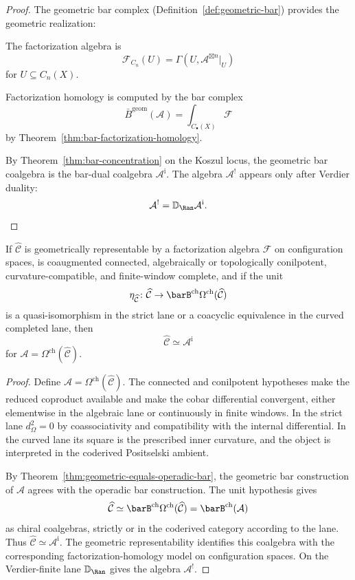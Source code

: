 \begin{proof}
The geometric bar complex (Definition~\ref{def:geometric-bar}) provides the
geometric realization:

The factorization algebra is
\[\mathcal{F}_{C_n}(U) = \Gamma(U, \mathcal{A}^{\boxtimes n}|_U)\]
for $U \subseteq C_n(X)$.

Factorization homology is computed by the bar complex
\[
\bar{B}^{\text{geom}}(\mathcal{A})
= \int_{C_\bullet(X)} \mathcal{F}
\]
by Theorem~\ref{thm:bar-factorization-homology}.

By Theorem~\ref{thm:bar-concentration} on the Koszul locus, the
geometric bar coalgebra is the bar-dual coalgebra
$\mathcal{A}^{\mathrm i}$. The algebra $\mathcal{A}^{!}$ appears only
after Verdier duality:
\[
\mathcal{A}^{!}=\mathbb{D}_{\Ran}\mathcal{A}^{\mathrm i}.
\]
\end{proof}

\begin{corollary}\label{cor:geom-implies-koszul}
If $\widehat{\mathcal{C}}$ is geometrically representable by a factorization algebra
$\mathcal{F}$ on configuration spaces, is coaugmented connected,
algebraically or topologically conilpotent, curvature-compatible, and
finite-window complete, and if the unit
\[
\eta_{\widehat{\mathcal{C}}}\colon
\widehat{\mathcal{C}}\to
\barB^{\mathrm{ch}}\Omega^{\mathrm{ch}}(\widehat{\mathcal{C}})
\]
is a quasi-isomorphism in the strict lane or a coacyclic equivalence
in the curved completed lane, then
\[\widehat{\mathcal{C}} \simeq \mathcal{A}^{\mathrm i}\]
for $\mathcal{A} = \Omega^{\mathrm{ch}}(\widehat{\mathcal{C}})$.
\end{corollary}

\begin{proof}
Define $\mathcal{A}=\Omega^{\mathrm{ch}}(\widehat{\mathcal{C}})$.
The connected and conilpotent hypotheses make the reduced coproduct
available and make the cobar differential convergent, either
elementwise in the algebraic lane or continuously in finite windows.
In the strict lane $d_\Omega^2=0$ by coassociativity and compatibility
with the internal differential. In the curved lane its square is the
prescribed inner curvature, and the object is interpreted in the
coderived Positselski ambient.

By Theorem~\ref{thm:geometric-equals-operadic-bar}, the geometric bar
construction of $\mathcal{A}$ agrees with the operadic bar construction.
The unit hypothesis gives
\[
\widehat{\mathcal{C}}\simeq
\barB^{\mathrm{ch}}\Omega^{\mathrm{ch}}(\widehat{\mathcal{C}})
=\barB^{\mathrm{ch}}(\mathcal{A})
\]
as chiral coalgebras, strictly or in the coderived category according
to the lane. Thus
$\widehat{\mathcal{C}}\simeq\mathcal{A}^{\mathrm i}$. The geometric
representability identifies this coalgebra with the corresponding
factorization-homology model on configuration spaces. On the
Verdier-finite lane $\mathbb{D}_{\Ran}$ gives the algebra
$\mathcal{A}^{!}$.
\end{proof}

